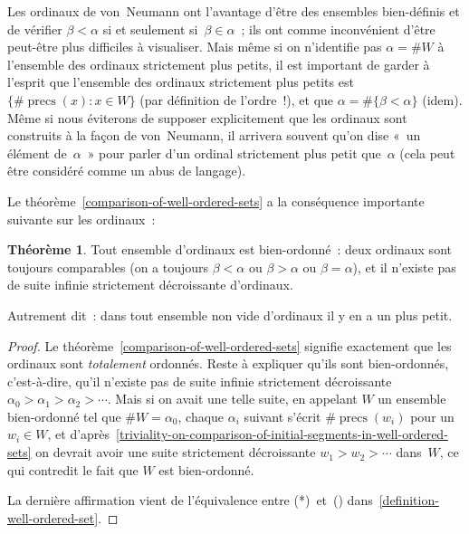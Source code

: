 \documentclass[12pt,a4paper]{article}
\theoremstyle{definition}
\newtheorem{thm}[comcnt]{Théorème}
\newcommand{\precs}{\operatorname{precs}}
\begin{document}
Les ordinaux de von Neumann ont l'avantage d'être des ensembles
bien-définis et de vérifier $\beta < \alpha$ si et seulement si $\beta
\in \alpha$ ; ils ont comme inconvénient d'être peut-être plus
difficiles à visualiser.  Mais même si on n'identifie pas $\alpha =
\#W$ à l'ensemble des ordinaux strictement plus petits, il est
important de garder à l'esprit que l'ensemble des ordinaux strictement
plus petits est $\{\#\precs(x) : x \in W\}$ (par définition de
l'ordre !), et que $\alpha = \#\{\beta < \alpha\}$ (idem).  Même si
nous éviterons de supposer explicitement que les ordinaux sont
construits à la façon de von Neumann, il arrivera souvent qu'on dise
« un élément de $\alpha$ » pour parler d'un ordinal strictement plus
petit que $\alpha$ (cela peut être considéré comme un abus de
langage).

\bigbreak

Le théorème \ref{comparison-of-well-ordered-sets} a la conséquence
importante suivante sur les ordinaux :

\begin{thm}\label{sets-of-ordinals-are-well-ordered}
Tout ensemble d'ordinaux est bien-ordonné : deux ordinaux sont
toujours comparables (on a toujours $\beta<\alpha$ ou $\beta>\alpha$
ou $\beta=\alpha$), et il n'existe pas de suite infinie strictement
décroissante d'ordinaux.

Autrement dit : dans tout ensemble non vide d'ordinaux il y en a un
plus petit.
\end{thm}
\begin{proof}
Le théorème \ref{comparison-of-well-ordered-sets} signifie exactement
que les ordinaux sont \emph{totalement} ordonnés.  Reste à expliquer
qu'ils sont bien-ordonnés, c'est-à-dire, qu'il n'existe pas de suite
infinie strictement décroissante $\alpha_0 > \alpha_1 > \alpha_2 >
\cdots$.  Mais si on avait une telle suite, en appelant $W$ un
ensemble bien-ordonné tel que $\#W = \alpha_0$, chaque $\alpha_i$
suivant s'écrit $\#\precs(w_i)$ pour un $w_i \in W$, et
d'après \ref{triviality-on-comparison-of-initial-segments-in-well-ordered-sets}
on devrait avoir une suite strictement décroissante $w_1 > w_2 >
\cdots$ dans $W$, ce qui contredit le fait que $W$ est bien-ordonné.

La dernière affirmation vient de l'équivalence entre (*) et (\dag)
dans \ref{definition-well-ordered-set}.
\end{proof}
\end{document}
